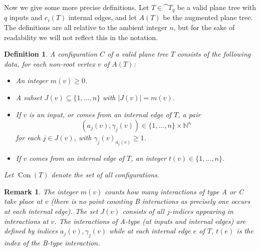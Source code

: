 \documentclass[english,letter paper,12pt,leqno]{article}
\theoremstyle{example}
\newtheorem{definition}[theorem]{Definition}
\newtheorem{remark}[theorem]{Remark}
\numberwithin{equation}{section}
\begin{document}
Now we give some more precise definitions. Let $T \in \cat{T}_q$ be a valid plane tree with $q$ inputs and $e_i(T)$ internal edges, and let $A(T)$ be the augmented plane tree. The definitions are all relative to the ambient integer $n$, but for the sake of readability we will not reflect this in the notation.

\begin{definition}\label{defn:config} A \emph{configuration} $C$ of a valid plane tree $T$ consists of the following data, for each non-root vertex $v$ of $A(T)$:
\begin{itemize}
\item An integer $m(v) \ge 0$.
\item A subset $J(v) \subseteq \{ 1,\ldots, n \}$ with $|J(v)| = m(v)$. 
\item If $v$ is an input, or comes from an internal edge of $T$, a pair
\[
( a_j(v), \gamma_j(v) ) \in \{ 1, \ldots, n \} \times \mathbb{N}^n
\]
for each $j \in J(v)$, with $\gamma_j(v)_{a_j(v)} \ge 1$.
\item If $v$ comes from an internal edge of $T$, an integer $t(v) \in \{1,\ldots,n\}$.
\end{itemize}
Let $\operatorname{Con}(T)$ denote the set of all configurations.
\end{definition} 

\begin{remark} The integer $m(v)$ counts how many interactions of type A or C take place at $v$ (there is no point counting B interactions as precisely one occurs at each internal edge). The set $J(v)$ consists of all $j$-indices appearing in interactions at $v$. The interactions of A-type (at inputs and internal edges) are defined by indices $a_j(v), \gamma_j(v)$ while at each internal edge $e$ of $T$, $t(e)$ is the index of the B-type interaction.
\end{remark}
\end{document}
